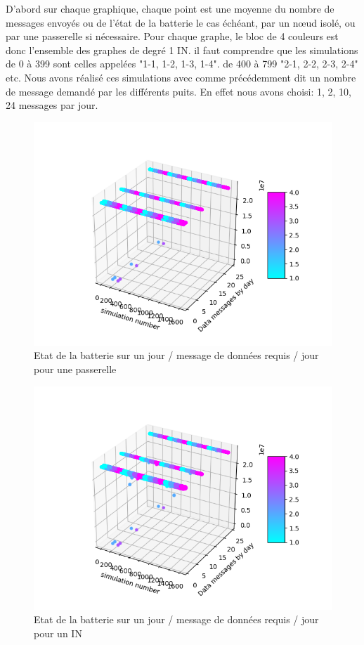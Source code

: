 D'abord sur chaque graphique, chaque point est une moyenne du nombre de messages envoyés ou de l'état de la batterie le cas échéant, par un nœud isolé, ou par une passerelle si nécessaire. Pour chaque graphe, le bloc de 4 couleurs est donc l'ensemble des graphes de degré 1 IN. il faut comprendre que les simulations de 0 à 399 sont celles appelées "1-1, 1-2, 1-3, 1-4". de 400 à 799 "2-1, 2-2, 2-3, 2-4" etc.
Nous avons réalisé ces simulations avec comme précédemment dit un nombre de message demandé par les différents puits. En effet nous avons choisi: 1, 2, 10, 24 messages par jour.
\begin{figure}[!ht]
\centerline {\includegraphics[scale=0.5]{graphics_resultats/bat/Sim_MSG_SEND_data_bat_gw_degree_gw.png}}
\caption {Etat de la batterie sur un jour / message de données requis / jour pour une passerelle}
\label{A}
\end{figure}

\begin{figure}[!ht]
\centerline{\includegraphics[scale = 0.5]{graphics_resultats/bat/Sim_MSG_SEND_data_bat_in_degree_GW.png}}
\caption{Etat de la batterie sur un jour / message de données requis / jour pour un IN}
\label{A}
\end{figure}


